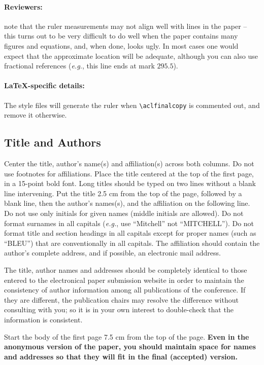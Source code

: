 \documentclass[11pt,a4paper]{article}
\begin{document}
\paragraph{Reviewers:}
note that the ruler measurements may not align well with lines in the paper -- this turns out to be very difficult to do well when the paper contains many figures and equations, and, when done, looks ugly.
In most cases one would expect that the approximate location will be adequate, although you can also use fractional references (\emph{e.g.}, this line ends at mark $295.5$).

\paragraph{\LaTeX-specific details:}
The style files will generate the ruler when {\small\verb|\aclfinalcopy|} is commented out, and remove it otherwise.

\subsection{Title and Authors}
\label{ssec:title-authors}

Center the title, author's name(s) and affiliation(s) across both columns.
Do not use footnotes for affiliations.
Place the title centered at the top of the first page, in a 15-point bold font.
Long titles should be typed on two lines without a blank line intervening.
Put the title 2.5 cm from the top of the page, followed by a blank line, then the author's names(s), and the affiliation on the following line.
Do not use only initials for given names (middle initials are allowed).
Do not format surnames in all capitals (\emph{e.g.}, use ``Mitchell'' not ``MITCHELL'').
Do not format title and section headings in all capitals except for proper names (such as ``BLEU'') that are
conventionally in all capitals.
The affiliation should contain the author's complete address, and if possible, an electronic mail address.

The title, author names and addresses should be completely identical to those entered to the electronical paper submission website in order to maintain the consistency of author information among all publications of the conference.
If they are different, the publication chairs may resolve the difference without consulting with you; so it is in your own interest to double-check that the information is consistent.

Start the body of the first page 7.5 cm from the top of the page.
\textbf{Even in the anonymous version of the paper, you should maintain space for names and addresses so that they will fit in the final (accepted) version.}
\end{document}
